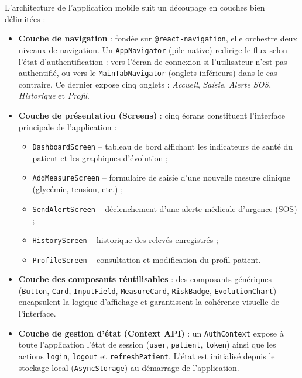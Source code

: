 \documentclass[12pt,a4paper,oneside]{report}
\begin{document}
L'architecture de l'application mobile suit un découpage en couches bien délimitées :

\begin{itemize}
  \item \textbf{Couche de navigation} : fondée sur \texttt{@react-navigation},
    elle orchestre deux niveaux de navigation. Un
    \texttt{AppNavigator} (pile native) redirige le flux selon l'état
    d'authentification : vers l'écran de connexion si l'utilisateur n'est
    pas authentifié, ou vers le \texttt{MainTabNavigator} (onglets inférieurs)
    dans le cas contraire. Ce dernier expose cinq onglets :
    \textit{Accueil}, \textit{Saisie}, \textit{Alerte SOS}, \textit{Historique}
    et \textit{Profil}.

  \item \textbf{Couche de présentation (Screens)} : cinq écrans constituent
    l'interface principale de l'application :
    \begin{itemize}
      \item \texttt{DashboardScreen} -- tableau de bord affichant les indicateurs
        de santé du patient et les graphiques d'évolution ;
      \item \texttt{AddMeasureScreen} -- formulaire de saisie d'une nouvelle
        mesure clinique (glycémie, tension, etc.) ;
      \item \texttt{SendAlertScreen} -- déclenchement d'une alerte médicale
        d'urgence (SOS) ;
      \item \texttt{HistoryScreen} -- historique des relevés
        enregistrés ;
      \item \texttt{ProfileScreen} -- consultation et modification du profil
        patient.
    \end{itemize}

  \item \textbf{Couche des composants réutilisables} : des composants génériques
    (\texttt{Button}, \texttt{Card}, \texttt{InputField}, \texttt{MeasureCard},
    \texttt{RiskBadge}, \texttt{EvolutionChart}) encapsulent la logique
    d'affichage et garantissent la cohérence visuelle de l'interface.

  \item \textbf{Couche de gestion d'état (Context API)} : un
    \texttt{AuthContext} expose à toute l'application l'état de session
    (\texttt{user}, \texttt{patient}, \texttt{token}) ainsi que les actions
    \texttt{login}, \texttt{logout} et \texttt{refreshPatient}. L'état est
    initialisé depuis le stockage local (\texttt{AsyncStorage}) au démarrage
    de l'application.


\end{itemize}
\end{document}
